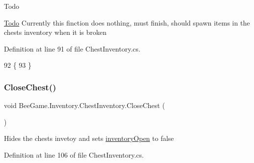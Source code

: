 \begin{DoxyRefDesc}{Todo}
\item[\hyperlink{todo__todo000004}{Todo}]Currently this finction does nothing, must finish, should spawn items in the chests inventory when it is broken \end{DoxyRefDesc}


Definition at line 91 of file Chest\+Inventory.\+cs.


\begin{DoxyCode}
92         \{
93         \}
\end{DoxyCode}
\mbox{\label{class_bee_game_1_1_inventory_1_1_chest_inventory_a0a42c60f89a1c79ce2be4f23da86e7b6}} 
\subsubsection{\texorpdfstring{Close\+Chest()}{CloseChest()}}
{\footnotesize\ttfamily void Bee\+Game.\+Inventory.\+Chest\+Inventory.\+Close\+Chest (\begin{DoxyParamCaption}{ }\end{DoxyParamCaption})}



Hides the chests invetoy and sets \hyperlink{class_bee_game_1_1_inventory_1_1_chest_inventory_a3e3529178934f2a4a8e91529c148457c}{inventory\+Open} to false 



Definition at line 106 of file Chest\+Inventory.\+cs.


